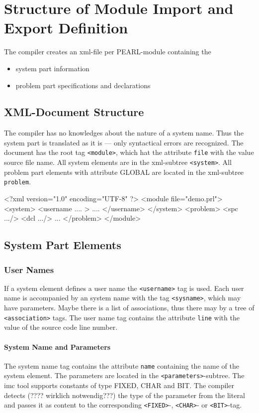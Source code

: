 \chapter{Structure of Module Import and Export Definition}

The compiler creates an xml-file per PEARL-module containing the
\begin{itemize}
\item system part information
\item problem part specifications and declarations
\end{itemize}

\section{XML-Document Structure}
The compiler has no knowledges about the nature of a system name.
Thus the system part is translated as it is --- only syntactical errors
are recognized. 
The document has the root tag \verb|<module>|, which hat the attribute
\verb|file| with the value source file name.  
All system elements are in the xml-subtree \verb|<system>|.
All problem part elements with attribute GLOBAL are located
in the xml-subtree \verb|problem|.

\begin{XMLCode}
<?xml version="1.0" encoding="UTF-8" ?>
<module file="demo.prl">
<system>
   <username .... >
   ....
   </username>
</system>
<problem>
  <spc .../>
  <dcl .../>
  ...
</problem>
</module>
\end{XMLCode}

\section{System Part Elements}
\subsection{User Names}
If a system element defines a user name the \verb|<username>| tag is 
used. Each user name is accompanied by an system name with the tag 
\verb|<sysname>|, which may have parameters.
Maybe there is a list of associations, thus there may by a tree
of \verb|<association>| tags.
The user name tag contains the attribute \verb|line| with the value of the 
source code line number.

\subsubsection{System Name and Parameters}
\label{sec_system_names}
The system name tag contains the attribute \verb|name| containing the 
name of the system element.
The parameters are located in the \verb|<parameters>|-subtree.
The imc tool supports constants of type FIXED, CHAR and BIT.
The compiler detects (???? wirklich notwendig???) the type of the parameter
from the literal and passes it as content to the corresponding
\verb|<FIXED>|-, \verb|<CHAR>|- or \verb|<BIT>|-tag.

